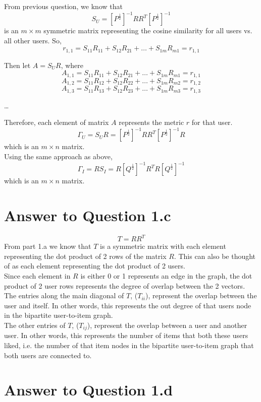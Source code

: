 \documentclass[11pt]{article}
\begin{document}
{From previous question, we know that $$S_U = [P^{\frac{1}{2}}]^{-1} RR^T [P^{\frac{1}{2}}]^{-1}$$ is an $m \times m$ symmetric matrix representing the cosine similarity for all users vs. all other users. So, 
$$r_{1,1} = S_{11}R_{11} + S_{12}R_{21} + \hdots + S_{1m}R_{m1} = r_{1,1}$$

Then let $A = S_UR$, where
$$A_{1,1} = S_{11}R_{11} + S_{12}R_{21} + \hdots + S_{1m}R_{m1} = r_{1,1}$$
$$A_{1,2} = S_{11}R_{12} + S_{12}R_{22} + \hdots + S_{1m}R_{m2} = r_{1,2} $$
$$A_{1,3} = S_{11}R_{13} + S_{12}R_{23} + \hdots + S_{1m}R_{m3} = r_{1,3} $$
\begin{center} {\dots} \end{center}

Therefore, each element of matrix $A$ represents the metric $r$ for that user.
$$\Gamma_U = S_UR = [P^{\frac{1}{2}}]^{-1} RR^T [P^{\frac{1}{2}}]^{-1}R$$ which is an $m \times n$ matrix.\\

Using the same approach as above, $$\Gamma_I = RS_I = R[Q^{\frac{1}{2}}]^{-1} R^TR [Q^{\frac{1}{2}}]^{-1}$$ which is an $m \times n$ matrix.

\pagebreak[4]
\section*{Answer to Question 1.c}
$$T = RR^T$$
From part 1.a we know that $T$ is a symmetric matrix with each element representing the dot product of 2 rows of the matrix $R$. This can also be thought of as each element representing the dot product of 2 users.\\

Since each element in $R$ is either 0 or 1 represents an edge in the graph, the dot product of 2 user rows represents the degree of overlap between the 2 vectors.\\

The entries along the main diagonal of $T$,  ($T_{ii}$), represent the overlap between the user and itself. In other words, this represents the out degree of that users node in the bipartite user-to-item graph.\\

The other entries of $T$,  ($T_{ij}$), represent the overlap between a user and another user. In other words, this represents the number of items that both these users liked, i.e. the number of that item nodes in the bipartite user-to-item graph that both users are connected to.

\pagebreak[4]
\section*{Answer to Question 1.d}

}
\end{document}
